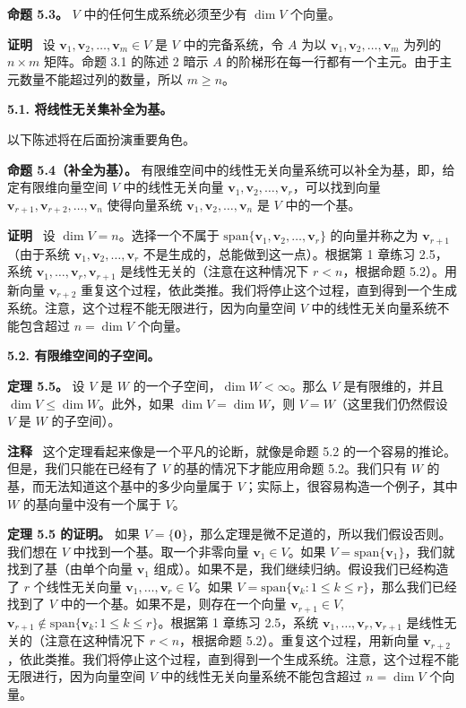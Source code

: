 \textbf{命题 5.3。} $V$ 中的任何生成系统必须至少有 $\dim V$ 个向量。

\textbf{证明}~ 设 $\mathbf{v}_1, \mathbf{v}_2, \dots, \mathbf{v}_m \in V$ 是 $V$ 中的完备系统，令 $A$ 为以 $\mathbf{v}_1, \mathbf{v}_2, \dots, \mathbf{v}_m$ 为列的 $n \times m$ 矩阵。命题 3.1 的陈述 2 暗示 $A$ 的阶梯形在每一行都有一个主元。由于主元数量不能超过列的数量，所以 $m \ge n$。

\textbf{5.1. 将线性无关集补全为基。}

以下陈述将在后面扮演重要角色。

\textbf{命题 5.4（补全为基）。} 有限维空间中的线性无关向量系统可以补全为基，即，给定有限维向量空间 $V$ 中的线性无关向量 $\mathbf{v}_1, \mathbf{v}_2, \dots, \mathbf{v}_r$，可以找到向量 $\mathbf{v}_{r+1}, \mathbf{v}_{r+2}, \dots, \mathbf{v}_n$ 使得向量系统 $\mathbf{v}_1, \mathbf{v}_2, \dots, \mathbf{v}_n$ 是 $V$ 中的一个基。

\textbf{证明}~ 设 $\dim V = n$。选择一个不属于 $\text{span}\{\mathbf{v}_1, \mathbf{v}_2, \dots, \mathbf{v}_r\}$ 的向量并称之为 $\mathbf{v}_{r+1}$（由于系统 $\mathbf{v}_1, \mathbf{v}_2, \dots, \mathbf{v}_r$ 不是生成的，总能做到这一点）。根据第 1 章练习 2.5，系统 $\mathbf{v}_1, \dots, \mathbf{v}_r, \mathbf{v}_{r+1}$ 是线性无关的（注意在这种情况下 $r < n$，根据命题 5.2）。用新向量 $\mathbf{v}_{r+2}$ 重复这个过程，依此类推。我们将停止这个过程，直到得到一个生成系统。注意，这个过程不能无限进行，因为向量空间 $V$ 中的线性无关向量系统不能包含超过 $n = \dim V$ 个向量。

\textbf{5.2. 有限维空间的子空间。}

\textbf{定理 5.5。} 设 $V$ 是 $W$ 的一个子空间，$\dim W < \infty$。那么 $V$ 是有限维的，并且 $\dim V \le \dim W$。此外，如果 $\dim V = \dim W$，则 $V = W$（这里我们仍然假设 $V$ 是 $W$ 的子空间）。

\textbf{注释}~ 这个定理看起来像是一个平凡的论断，就像是命题 5.2 的一个容易的推论。但是，我们只能在已经有了 $V$ 的基的情况下才能应用命题 5.2。我们只有 $W$ 的基，而无法知道这个基中的多少向量属于 $V$；实际上，很容易构造一个例子，其中 $W$ 的基向量中没有一个属于 $V$。

\textbf{定理 5.5 的证明。} 如果 $V = \{\mathbf{0}\}$，那么定理是微不足道的，所以我们假设否则。我们想在 $V$ 中找到一个基。取一个非零向量 $\mathbf{v}_1 \in V$。如果 $V = \text{span}\{\mathbf{v}_1\}$，我们就找到了基（由单个向量 $\mathbf{v}_1$ 组成）。如果不是，我们继续归纳。假设我们已经构造了 $r$ 个线性无关向量 $\mathbf{v}_1, \dots, \mathbf{v}_r \in V$。如果 $V = \text{span}\{\mathbf{v}_k : 1 \le k \le r\}$，那么我们已经找到了 $V$ 中的一个基。如果不是，则存在一个向量 $\mathbf{v}_{r+1} \in V$, $\mathbf{v}_{r+1} \notin \text{span}\{\mathbf{v}_k : 1 \le k \le r\}$。根据第 1 章练习 2.5，系统 $\mathbf{v}_1, \dots, \mathbf{v}_r, \mathbf{v}_{r+1}$ 是线性无关的（注意在这种情况下 $r < n$，根据命题 5.2）。重复这个过程，用新向量 $\mathbf{v}_{r+2}$，依此类推。我们将停止这个过程，直到得到一个生成系统。注意，这个过程不能无限进行，因为向量空间 $V$ 中的线性无关向量系统不能包含超过 $n = \dim V$ 个向量。


